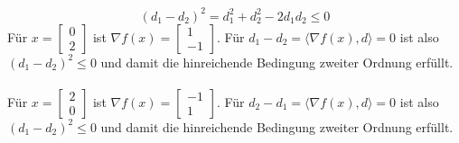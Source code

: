 \begin{compactenum}[(i)]
$$(d_1-d_2)^2=d_1^2+d_2^2-2d_1d_2\leq 0$$
Für $x=\begin{bmatrix}0\\2\end{bmatrix}$ ist $\nabla f(x)=\begin{bmatrix}1\\-1\end{bmatrix}$. Für $d_1-d_2=\langle \nabla f(x),d\rangle=0$ ist also $(d_1-d_2)^2\leq 0$ und damit die hinreichende Bedingung zweiter Ordnung erfüllt.\\\\
Für $x=\begin{bmatrix}2\\0\end{bmatrix}$ ist $\nabla f(x)=\begin{bmatrix}-1\\1\end{bmatrix}$. Für $d_2-d_1=\langle \nabla f(x),d\rangle=0$ ist also $(d_1-d_2)^2\leq 0$ und damit die hinreichende Bedingung zweiter Ordnung erfüllt.
\end{compactenum}